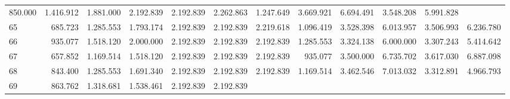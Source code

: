 \begin{tabular}{llllllllllll}
  \multicolumn{1}{|r}{850.000} &
  \multicolumn{1}{r}{1.416.912} &
  \multicolumn{1}{r}{1.881.000} &
  \multicolumn{1}{r}{2.192.839} &
  \multicolumn{1}{r}{2.192.839} &
  \multicolumn{1}{r}{2.262.863} &
  \multicolumn{1}{r}{1.247.649} &
  \multicolumn{1}{r}{3.669.921} &
  \multicolumn{1}{r}{6.694.491} &
  \multicolumn{1}{r}{3.548.208} &
  \multicolumn{1}{r}{5.991.828} \\
\multicolumn{1}{l}{\hspace{1em}65} &
  \multicolumn{1}{|r}{685.723} &
  \multicolumn{1}{r}{1.285.553} &
  \multicolumn{1}{r}{1.793.174} &
  \multicolumn{1}{r}{2.192.839} &
  \multicolumn{1}{r}{2.192.839} &
  \multicolumn{1}{r}{2.219.618} &
  \multicolumn{1}{r}{1.096.419} &
  \multicolumn{1}{r}{3.528.398} &
  \multicolumn{1}{r}{6.013.957} &
  \multicolumn{1}{r}{3.506.993} &
  \multicolumn{1}{r}{6.236.780} \\
\multicolumn{1}{l}{\hspace{1em}66} &
  \multicolumn{1}{|r}{935.077} &
  \multicolumn{1}{r}{1.518.120} &
  \multicolumn{1}{r}{2.000.000} &
  \multicolumn{1}{r}{2.192.839} &
  \multicolumn{1}{r}{2.192.839} &
  \multicolumn{1}{r}{2.192.839} &
  \multicolumn{1}{r}{1.285.553} &
  \multicolumn{1}{r}{3.324.138} &
  \multicolumn{1}{r}{6.000.000} &
  \multicolumn{1}{r}{3.307.243} &
  \multicolumn{1}{r}{5.414.642} \\
\multicolumn{1}{l}{\hspace{1em}67} &
  \multicolumn{1}{|r}{657.852} &
  \multicolumn{1}{r}{1.169.514} &
  \multicolumn{1}{r}{1.518.120} &
  \multicolumn{1}{r}{2.192.839} &
  \multicolumn{1}{r}{2.192.839} &
  \multicolumn{1}{r}{2.192.839} &
  \multicolumn{1}{r}{935.077} &
  \multicolumn{1}{r}{3.500.000} &
  \multicolumn{1}{r}{6.735.702} &
  \multicolumn{1}{r}{3.617.030} &
  \multicolumn{1}{r}{6.887.098} \\
\multicolumn{1}{l}{\hspace{1em}68} &
  \multicolumn{1}{|r}{843.400} &
  \multicolumn{1}{r}{1.285.553} &
  \multicolumn{1}{r}{1.691.340} &
  \multicolumn{1}{r}{2.192.839} &
  \multicolumn{1}{r}{2.192.839} &
  \multicolumn{1}{r}{2.192.839} &
  \multicolumn{1}{r}{1.169.514} &
  \multicolumn{1}{r}{3.462.546} &
  \multicolumn{1}{r}{7.013.032} &
  \multicolumn{1}{r}{3.312.891} &
  \multicolumn{1}{r}{4.966.793} \\
\multicolumn{1}{l}{\hspace{1em}69} &
  \multicolumn{1}{|r}{863.762} &
  \multicolumn{1}{r}{1.318.681} &
  \multicolumn{1}{r}{1.538.461} &
  \multicolumn{1}{r}{2.192.839} &
  \multicolumn{1}{r}{2.192.839} &

\end{tabular}
